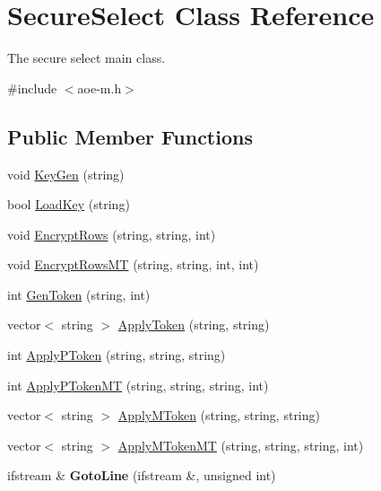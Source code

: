 \hypertarget{classSecureSelect}{}\section{Secure\+Select Class Reference}
\label{classSecureSelect}


The secure select main class.  




{\ttfamily \#include $<$aoe-\/m.\+h$>$}

\subsection*{Public Member Functions}
\begin{DoxyCompactItemize}
\item 
void \hyperlink{classSecureSelect_a72c8b1ac19619a6eeaa722f766e53b3f}{Key\+Gen} (string)
\item 
bool \hyperlink{classSecureSelect_ad7a2125393de550771e4e9177a1552b3}{Load\+Key} (string)
\item 
void \hyperlink{classSecureSelect_ada64a34744ec0598327f8e926c7fa2d6}{Encrypt\+Rows} (string, string, int)
\item 
void \hyperlink{classSecureSelect_a8f760c424f6dc8277230be2f056dd1cc}{Encrypt\+Rows\+MT} (string, string, int, int)
\item 
int \hyperlink{classSecureSelect_a88e8f870930dfbeae24d355412b1d0a3}{Gen\+Token} (string, int)
\item 
vector$<$ string $>$ \hyperlink{classSecureSelect_a55312fbd535adba75ba328d060faff35}{Apply\+Token} (string, string)
\item 
int \hyperlink{classSecureSelect_aab33712ef6fbbe6922a2d8156b88dc27}{Apply\+P\+Token} (string, string, string)
\item 
int \hyperlink{classSecureSelect_a1a556c61d392fa9d2dfd1eb6684bafc1}{Apply\+P\+Token\+MT} (string, string, string, int)
\item 
vector$<$ string $>$ \hyperlink{classSecureSelect_a4b912c3407b0664ae37d2ccfce4eafc5}{Apply\+M\+Token} (string, string, string)
\item 
vector$<$ string $>$ \hyperlink{classSecureSelect_a168537e2cf5070fe9b137239a2d6155e}{Apply\+M\+Token\+MT} (string, string, string, int)
\item 
ifstream \& {\bfseries Goto\+Line} (ifstream \&, unsigned int)\hypertarget{classSecureSelect_a177b3724ce3e8ea4695b2950546d596d}{}\label{classSecureSelect_a177b3724ce3e8ea4695b2950546d596d}


\end{DoxyCompactItemize}
